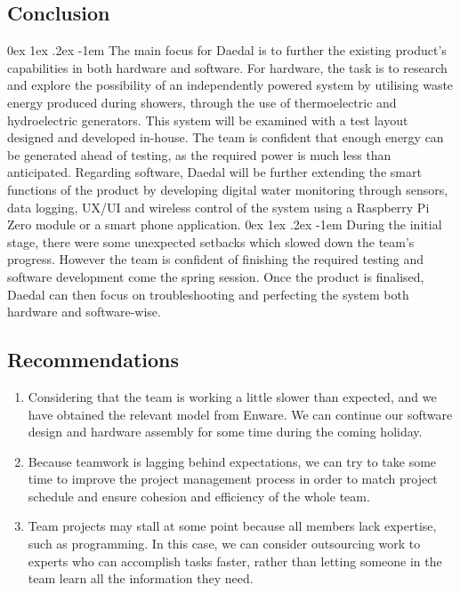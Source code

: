 \documentclass[12pt, a4paper]{article}
\makeatletter
\renewcommand\paragraph{\@startsection{paragraph}{5}{\parindent}%
  {0ex \@plus1ex \@minus.2ex}%
  {-1em}%
  {\normalfont\normalsize\bfseries}}
\makeatother
\begin{document}
        \subsection{Conclusion}
            \paragraph{}
                The main focus for Daedal is to further the existing product’s capabilities in both hardware and software. For hardware, the task is to research and 
                explore the possibility of an independently powered system by utilising waste energy produced during showers, through the use of thermoelectric and 
                hydroelectric generators. This system will be examined with a test layout designed and developed in-house. The team is confident that enough energy can 
                be generated ahead of testing, as the required power is much less than anticipated. Regarding software, Daedal will be further extending the smart 
                functions of the product by developing digital water monitoring through sensors, data logging, UX/UI and wireless control of the system using a 
                Raspberry Pi Zero module or a smart phone application. 
            \paragraph{}
                During the initial stage, there were some unexpected setbacks which slowed down the team’s progress. However the team is confident of finishing the 
                required testing and software development come the spring session. Once the product is finalised, Daedal can then focus on troubleshooting and 
                perfecting the system both hardware and software-wise.
        \subsection{Recommendations}
            \begin{enumerate}
                \item Considering that the team is working a little slower than expected, and we have obtained the relevant model from Enware. We can continue our 
                software design and hardware assembly for some time during the coming holiday.
                \item Because teamwork is lagging behind expectations, we can try to take some time to improve the project management process in order to match project 
                schedule and ensure cohesion and efficiency of the whole team.
                \item Team projects may stall at some point because all members lack expertise, such as programming. In this case, we can consider outsourcing work 
                to experts who can accomplish tasks faster, rather than letting someone in the team learn all the information they need.
            \end{enumerate}
\end{document}
